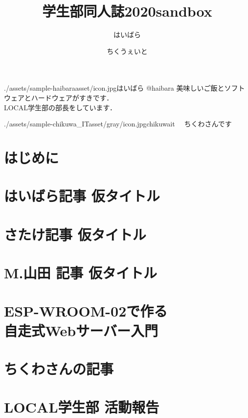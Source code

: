 \documentclass[autodetect-engine,dvipdfmx-if-dvi,ja=standard,b5paper,10.5pt,twoside,openany,layout=v2]{bxjsbook}
\title{学生部同人誌2020sandbox}
\author{はいばら \and ちくうぇいと }
\date{}
\newcommand{\articlepath}{./articles}
\newcommand{\assetspath}{./assets}
\newcommand{\chikuwaitasset}{\assetspath/sample-chikuwa_ITasset/gray}
\newcommand{\haibaraasset}{\assetspath/sample-haibaraasset}
\begin{document}
\frontmatter
\maketitle
\begin{myintroduce}{\haibaraasset/icon.jpg}{はいばら @haibara}
  美味しいご飯とソフトウェアとハードウェアがすきです．\\
  LOCAL学生部の部長をしています．
\end{myintroduce}
\begin{myintroduce}{\chikuwaitasset/icon.jpg}{chikuwait}
　ちくわさんです
\end{myintroduce}


\chapter{はじめに}
\addtolength{\oddsidemargin}{10pt}
\addtolength{\evensidemargin}{-10pt}


\tableofcontents
\mainmatter

\chapter{はいばら記事 仮タイトル}


\chapter{さたけ記事 仮タイトル}


\chapter{M.山田 記事 仮タイトル}


\chapter{ESP-WROOM-02で作る \\自走式Webサーバー入門}


\chapter{ちくわさんの記事}


\chapter{LOCAL学生部 活動報告}

  
\newpage
\myimpression[%
name=LOCAL Students\\情報ボーイズの寄稿ノート 2.0, %
author=はいばら， \and %
ちくうぇいと, %
date=2020年5月3日, %
publisher=LOCAL学生部, %
print=有限会社ねこのしっぽ %
]%
\end{document}
